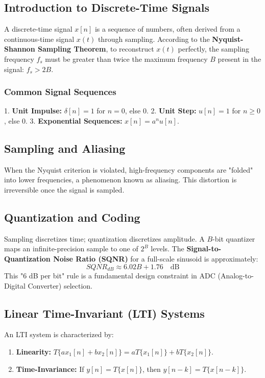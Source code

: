 
\subsection{Introduction to Discrete-Time Signals}
A discrete-time signal $x[n]$ is a sequence of numbers, often derived from a continuous-time signal $x(t)$ through sampling. According to the \textbf{Nyquist-Shannon Sampling Theorem}, to reconstruct $x(t)$ perfectly, the sampling frequency $f_s$ must be greater than twice the maximum frequency $B$ present in the signal: $f_s > 2B$.

\subsubsection{Common Signal Sequences}
1. \textbf{Unit Impulse:} $\delta[n] = 1$ for $n=0$, else $0$.
2. \textbf{Unit Step:} $u[n] = 1$ for $n \geq 0$, else $0$.
3. \textbf{Exponential Sequences:} $x[n] = a^n u[n]$.

\subsection{Sampling and Aliasing}
When the Nyquist criterion is violated, high-frequency components are "folded" into lower frequencies, a phenomenon known as aliasing. This distortion is irreversible once the signal is sampled.

\subsection{Quantization and Coding}
Sampling discretizes time; quantization discretizes amplitude. A $B$-bit quantizer maps an infinite-precision sample to one of $2^B$ levels.
The \textbf{Signal-to-Quantization Noise Ratio (SQNR)} for a full-scale sinusoid is approximately:
\begin{equation}
    SQNR_{dB} \approx 6.02B + 1.76 \quad \text{dB}
\end{equation}
This "6 dB per bit" rule is a fundamental design constraint in ADC (Analog-to-Digital Converter) selection.

\subsection{Linear Time-Invariant (LTI) Systems}
An LTI system is characterized by:
\begin{enumerate}
    \item \textbf{Linearity:} $T\{a x_1[n] + b x_2[n]\} = a T\{x_1[n]\} + b T\{x_2[n]\}$.
    \item \textbf{Time-Invariance:} If $y[n] = T\{x[n]\}$, then $y[n-k] = T\{x[n-k]\}$.
\end{enumerate}

